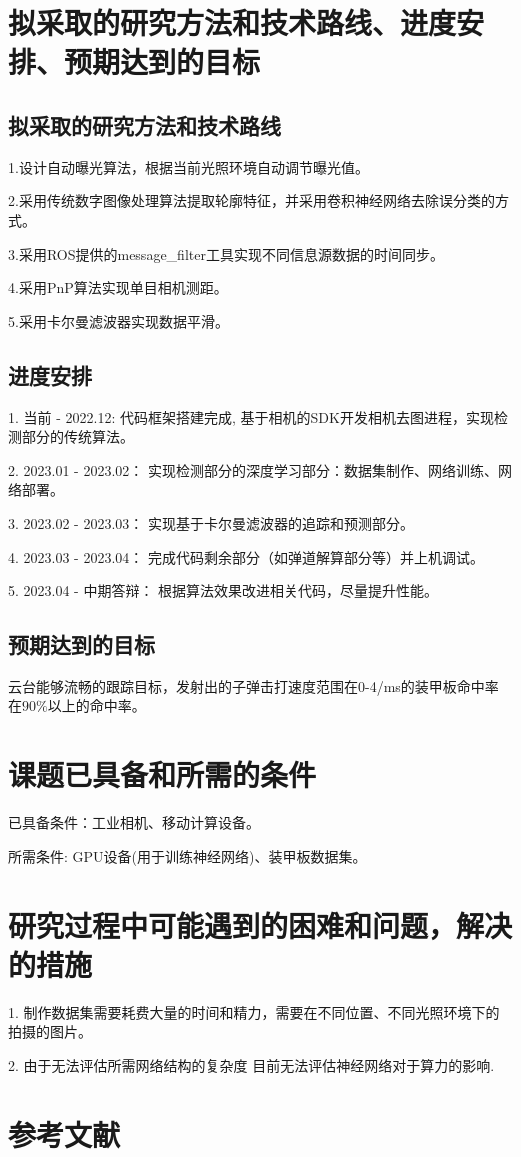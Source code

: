 \section{拟采取的研究方法和技术路线、进度安排、预期达到的目标}
\subsection{拟采取的研究方法和技术路线}
1.设计自动曝光算法，根据当前光照环境自动调节曝光值。 \par
2.采用传统数字图像处理算法提取轮廓特征，并采用卷积神经网络去除误分类的方式。 \par
3.采用ROS提供的message\_filter工具实现不同信息源数据的时间同步。 \par
4.采用PnP算法实现单目相机测距。 \par
5.采用卡尔曼滤波器实现数据平滑。 \par
\subsection{进度安排}
1. 当前 - 2022.12: 代码框架搭建完成, 基于相机的SDK开发相机去图进程，实现检测部分的传统算法。 \par
2. 2023.01 - 2023.02： 实现检测部分的深度学习部分：数据集制作、网络训练、网络部署。\par
3. 2023.02 - 2023.03： 实现基于卡尔曼滤波器的追踪和预测部分。\par
4. 2023.03 - 2023.04： 完成代码剩余部分（如弹道解算部分等）并上机调试。\par
5. 2023.04 - 中期答辩： 根据算法效果改进相关代码，尽量提升性能。\par
\subsection{预期达到的目标}
云台能够流畅的跟踪目标，发射出的子弹击打速度范围在0-4/ms的装甲板命中率在$90\%$以上的命中率。
\section{课题已具备和所需的条件}
已具备条件：工业相机、移动计算设备。 \par
所需条件: GPU设备(用于训练神经网络)、装甲板数据集。 \par
\section{研究过程中可能遇到的困难和问题，解决的措施}
1. 制作数据集需要耗费大量的时间和精力，需要在不同位置、不同光照环境下的拍摄的图片。 \par
2. 由于无法评估所需网络结构的复杂度 目前无法评估神经网络对于算力的影响. \par
\newpage
\section{参考文献}



